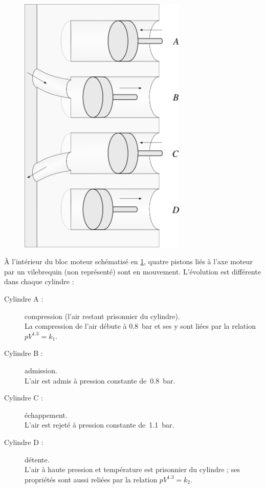 	\begin{figure}
		\begin{center}
			\includegraphics[width=8cm]{images/quatre_cylindres.png}
		\end{center}
		\label{fig_quatre_cylindres}
	\end{figure}
	
	À l’intérieur du bloc moteur schématisé en \cref{fig_quatre_cylindres}, quatre pistons liés à l’axe moteur par un vilebrequin (non représenté) sont en mouvement. L’évolution est différente dans chaque cylindre :
	
	\begin{description}
		\item [Cylindre A :] {compression (l’air restant prisonnier du cylindre).\nopagebreak\\
									La compression de l’air débute à \SI{0,8}{\bar} et ses y sont liées par la relation $p V^{\num{1,3}} = k_1$.}
		\item [Cylindre B :] {admission.\\
									L’air est admis à pression constante de~\SI{0,8}{\bar}.}
		\item [Cylindre C :] {échappement.\\
									L’air est rejeté à pression constante de~\SI{1,1}{\bar}.}
		\item [Cylindre D :] {détente.\\ 
									L’air à haute pression et température est prisonnier du cylindre ; ses propriétés sont aussi reliées par la relation $p V^{\num{1,3}} = k_2$.}
	\end{description}
		
